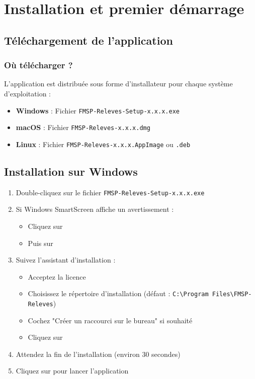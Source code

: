 \section{Installation et premier démarrage}

\subsection{Téléchargement de l'application}

\subsubsection{Où télécharger ?}

L'application est distribuée sous forme d'installateur pour chaque système d'exploitation :

\begin{itemize}[leftmargin=*]
    \item \textbf{Windows} : Fichier \texttt{FMSP-Releves-Setup-x.x.x.exe}
    \item \textbf{macOS} : Fichier \texttt{FMSP-Releves-x.x.x.dmg}
    \item \textbf{Linux} : Fichier \texttt{FMSP-Releves-x.x.x.AppImage} ou \texttt{.deb}
\end{itemize}


\subsection{Installation sur Windows}

\begin{enumerate}[leftmargin=*]
    \item Double-cliquez sur le fichier \texttt{FMSP-Releves-Setup-x.x.x.exe}
    \item Si Windows SmartScreen affiche un avertissement :
    \begin{itemize}
        \item Cliquez sur 
        \item Puis sur 
    \end{itemize}
    \item Suivez l'assistant d'installation :
    \begin{itemize}
        \item Acceptez la licence
        \item Choisissez le répertoire d'installation (défaut : \texttt{C:\textbackslash Program Files\textbackslash FMSP-Releves})
        \item Cochez "Créer un raccourci sur le bureau" si souhaité
        \item Cliquez sur 
    \end{itemize}
    \item Attendez la fin de l'installation (environ 30 secondes)
    \item Cliquez sur  pour lancer l'application
\end{enumerate}

